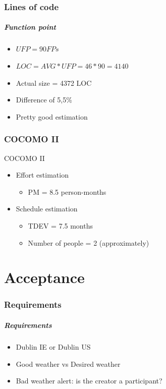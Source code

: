 \documentclass[professionalfont]{beamer}
\begin{document}
\section{Lines of code}
\begin{frame}
\frametitle{Function point}
\begin{itemize}
\item<1-> $UFP = 90 FPs$
\item<1-> $LOC = AVG*UFP = 46*90 = 4140$
\item<2-> Actual size = 4372 LOC
\item<2-> Difference of 5,5\%
\item<2-> \alert{Pretty good estimation} 
\end{itemize}
\end{frame}

\section{COCOMO II}
\begin{frame}{COCOMO II}
\begin{itemize}
\item Effort estimation
\begin{itemize}
\item PM = 8.5 person-months
\end{itemize}
\item Schedule estimation
\begin{itemize}
\item TDEV = 7.5 months
\item Number of people = 2 (approximately)
\end{itemize}
\end{itemize}
\end{frame}

\part{Acceptance}
\label{part:Acceptance}
\section{Requirements}
\begin{frame}
\frametitle{Requirements}
\begin{itemize}
\item Dublin IE or Dublin US
\item Good weather vs Desired weather
\item Bad weather alert: is the creator a participant?
\end{itemize}
\end{frame}
\end{document}

